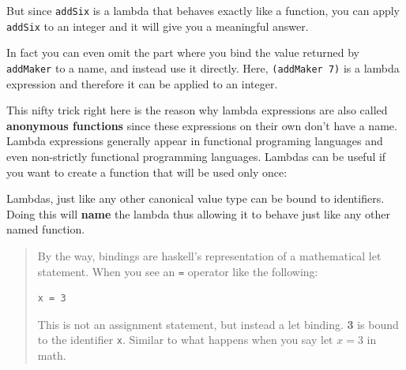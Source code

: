 But since \texttt{addSix} is a lambda that behaves exactly like a
function, you can apply \texttt{addSix} to an integer and it will give
you a meaningful answer.

\begin{Shaded}
\begin{Highlighting}[]
\OperatorTok{\textgreater{}}
\end{Highlighting}
\end{Shaded}

In fact you can even omit the part where you bind the value returned by
\texttt{addMaker} to a name, and instead use it directly. Here,
\texttt{(addMaker\ 7)} is a lambda expression and therefore it can be
applied to an integer.

\begin{Shaded}
\begin{Highlighting}[]
\OperatorTok{\textgreater{}}\NormalTok{) }
\end{Highlighting}
\end{Shaded}

This nifty trick right here is the reason why lambda expressions are
also called \textbf{anonymous functions} since these expressions on
their own don't have a name. Lambda expressions generally appear in
functional programing languages and even non-strictly functional
programming languages. Lambdas can be useful if you want to create a
function that will be used only once:

\begin{Shaded}
\begin{Highlighting}[]
\OperatorTok{\textgreater{}}\OtherTok{{-}\textgreater{}}\OperatorTok{+} \NormalTok{) }
\OperatorTok{\textgreater{}}\OtherTok{{-}\textgreater{}}\OperatorTok{*}
\end{Highlighting}
\end{Shaded}

Lambdas, just like any other canonical value type can be bound to
identifiers. Doing this will \textbf{name} the lambda thus allowing it
to behave just like any other named function.

\begin{quote}
By the way, bindings are haskell's representation of a mathematical let
statement. When you see an \texttt{=} operator like the following:

\begin{verbatim}
x = 3
\end{verbatim}

This is not an assignment statement, but instead a let binding.
\textbf{3} is bound to the identifier \texttt{x}. Similar to what
happens when you say \(\text{let } x = 3\) in math.
\end{quote}

